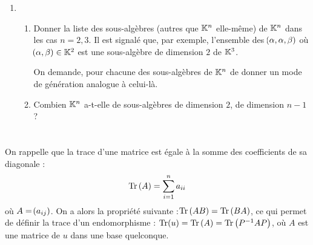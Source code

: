 \documentclass[a4paper,french,bookmarks]{article}
\begin{document}
\begin{enumerate}
        \item \begin{enumerate}
            \item Donner la liste des sous-algèbres (autres que $\mathbb{K}^n$ elle-même) de $\mathbb{K}^n$ dans les cas $n = 2, 3$. Il est signalé que, par exemple, l'ensemble des $\!\left(\alpha, \alpha, \beta\right)$ où $\!\left(\alpha, \beta\right) \in \mathbb{K}^2$ est une sous-algèbre de dimension $2$ de $\mathbb{K}^3$.
            
            On demande, pour chacune des sous-algèbres de $\mathbb{K}^n$ de donner un mode de génération analogue à celui-là.
            
            
            
            
            \item Combien $\mathbb{K}^n$ a-t-elle de sous-algèbres de dimension $2$, de dimension $n-1$ ?
            
        \end{enumerate}
    \end{enumerate}
    
    \section{}
    
    On rappelle que la trace d'une matrice est égale à la somme des coefficients de sa diagonale :
    \[ \Tr{A} = \sum_{i=1}^n a_{ii}\]
    où $A = \!\left(a_{ij}\right)$. On a alors la propriété suivante :\quad $\Tr{AB} = \Tr{BA}$, ce qui permet de définir la trace d'un endomorphisme : \quad $\Tr\p{u} = \Tr{A} = \Tr{P^{-1}AP}$, où $A$ est une matrice de $u$ dans une base quelconque.
    
\end{document}
